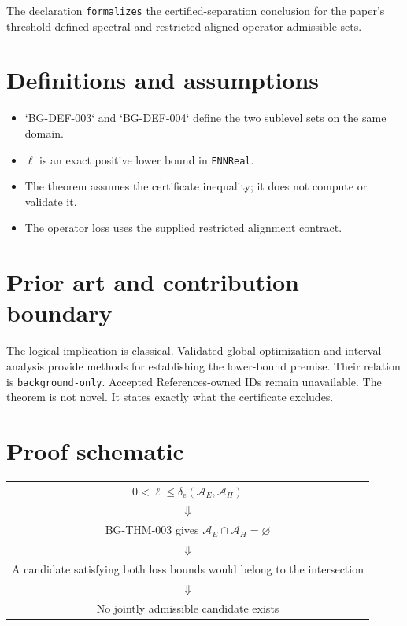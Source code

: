\documentclass[11pt]{article}
\begin{document}
The declaration \texttt{formalizes} the certified-separation conclusion for the paper's
threshold-defined spectral and restricted aligned-operator admissible sets.

\section{Definitions and assumptions}

\begin{itemize}
 \item `BG-DEF-003` and `BG-DEF-004` define the two sublevel sets on the same domain.
 \item $\ell$ is an exact positive lower bound in \texttt{ENNReal}.
 \item The theorem assumes the certificate inequality; it does not compute or validate it.
 \item The operator loss uses the supplied restricted alignment contract.
\end{itemize}

\section{Prior art and contribution boundary}

The logical implication is classical. Validated global optimization and interval
analysis provide methods for establishing the lower-bound premise. Their relation is
\texttt{background-only}. Accepted References-owned IDs remain unavailable. The theorem
is not novel. It states exactly what the certificate excludes.

\section{Proof schematic}

\begin{center}
\begin{tabular}{c}
$0<\ell\le\delta_{\mathrm e}(\mathcal A_E,\mathcal A_H)$ \\
$\Downarrow$ \\
BG-THM-003 gives $\mathcal A_E\cap\mathcal A_H=\varnothing$ \\
$\Downarrow$ \\
A candidate satisfying both loss bounds would belong to the intersection \\
$\Downarrow$ \\
No jointly admissible candidate exists
\end{tabular}
\end{center}
\end{document}
